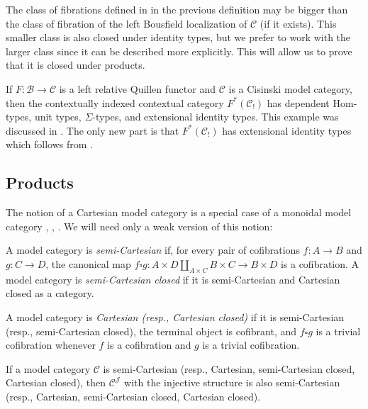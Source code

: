 \documentclass[reqno]{amsart}
\theoremstyle{definition}
\theoremstyle{remark}
\newcommand{\fs}[1]{\mathrm{#1}}
\newcommand{\scat}[1]{\mathcal{#1}}
\newcommand{\Hom}{\fs{Hom}}
\numberwithin{figure}{section}
\begin{document}
\begin{remark}
The class of fibrations defined in in the previous definition may be bigger than the class of fibration of the left Bousfield localization of $\scat{C}$ (if it exists).
This smaller class is also closed under identity types, but we prefer to work with the larger class since it can be described more explicitly.
This will allow us to prove that it is closed under products.
\end{remark}

\begin{example}
If $F : \scat{B} \to \scat{C}$ is a left relative Quillen functor and $\scat{C}$ is a Cisinski model category, then 
the contextually indexed contextual category $F^*(\scat{C}_!)$ has dependent $\Hom$-types, unit types, $\Sigma$-types, and extensional identity types.
This example was discussed in .
The only new part is that $F^*(\scat{C}_!)$ has extensional identity types which follows from .
\end{example}

\subsection{Products}

The notion of a Cartesian model category is a special case of a monoidal model category \cite[Definition~A.3.1.2]{lurie-topos}, \cite[Definition~4.2.6]{hovey}, \cite[Subsection~2.5]{segal-spaces}.
We will need only a weak version of this notion:

\begin{defn}
A model category is \emph{semi-Cartesian} if, for every pair of cofibrations $f : A \to B$ and $g : C \to D$,
the canonical map $f \square g : A \times D \amalg_{A \times C} B \times C \to B \times D$ is a cofibration.
A model category is \emph{semi-Cartesian closed} if it is semi-Cartesian and Cartesian closed as a category.
\end{defn}

\begin{remark}[cartesian]
A model category is \emph{Cartesian (resp., Cartesian closed)} if it is semi-Cartesian (resp., semi-Cartesian closed), the terminal object is cofibrant, and $f \square g$ is a trivial cofibration whenever $f$ is a cofibration and $g$ is a trivial cofibration.
\end{remark}

\begin{example}
If a model category $\scat{C}$ is semi-Cartesian (resp., Cartesian, semi-Cartesian closed, Cartesian closed), then $\scat{C}^\scat{J}$ with the injective structure is also semi-Cartesian (resp., Cartesian, semi-Cartesian closed, Cartesian closed).
\end{example}
\end{document}

